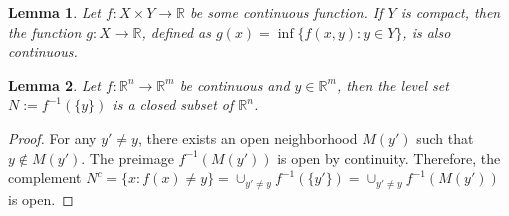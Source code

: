 \documentclass{report}
\theoremstyle{definition}
\theoremstyle{plain}
\newtheorem{lemma}{Lemma}[chapter]
\newcommand*\diff{\mathop{}\!\mathrm{d}}
\begin{document}
\begin{lemma}\label{lemma:inf-continuous}
  Let $f : X \times Y \rightarrow \mathbb{R}$ be some continuous function. If
  $Y$ is compact, then the function $g : X \rightarrow \mathbb{R}$, defined as
  $g(x) = \inf \{ f(x,y) : y\in Y\}$, is also continuous.
\end{lemma}

\begin{lemma}\label{lemma:levelset}
  Let $f :\mathbb{R}^{n} \rightarrow \mathbb{R}^{m}$ be continuous and
  $y \in \mathbb{R}^{m}$, then the level set $N := f^{-1}(\{ y \})$ is a closed
  subset of $\mathbb{R}^{n}$.
\end{lemma}
\begin{proof}
  For any $y' \neq y$, there exists an open neighborhood $M(y')$ such that
  $y \notin M(y')$. The preimage $f^{-1}(M(y'))$ is open by continuity.
  Therefore, the complement
  $N^{c} = \{ x : f(x) \neq y \} = \cup_{y' \neq y} f^{-1}(\{y'\}) = \cup_{y' \neq y} f^{-1}(M(y'))$
  is open.
\end{proof}


\end{document}

